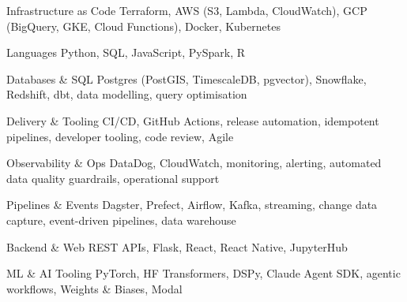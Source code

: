 
\begin{cvskills}

  \cvskill
    {Infrastructure as Code}
    {Terraform, AWS (S3, Lambda, CloudWatch), GCP (BigQuery, GKE, Cloud Functions), Docker, Kubernetes}

  \cvskill
    {Languages}
    {Python, SQL, JavaScript, PySpark, R}

  \cvskill
    {Databases \& SQL}
    {Postgres (PostGIS, TimescaleDB, pgvector), Snowflake, Redshift, dbt, data modelling, query optimisation}

  \cvskill
    {Delivery \& Tooling}
    {CI/CD, GitHub Actions, release automation, idempotent pipelines, developer tooling, code review, Agile}

  \cvskill
    {Observability \& Ops}
    {DataDog, CloudWatch, monitoring, alerting, automated data quality guardrails, operational support}

  \cvskill
    {Pipelines \& Events}
    {Dagster, Prefect, Airflow, Kafka, streaming, change data capture, event-driven pipelines, data warehouse}

  \cvskill
    {Backend \& Web}
    {REST APIs, Flask, React, React Native, JupyterHub}

  \cvskill
    {ML \& AI Tooling}
    {PyTorch, HF Transformers, DSPy, Claude Agent SDK, agentic workflows, Weights \& Biases, Modal}

\end{cvskills}
